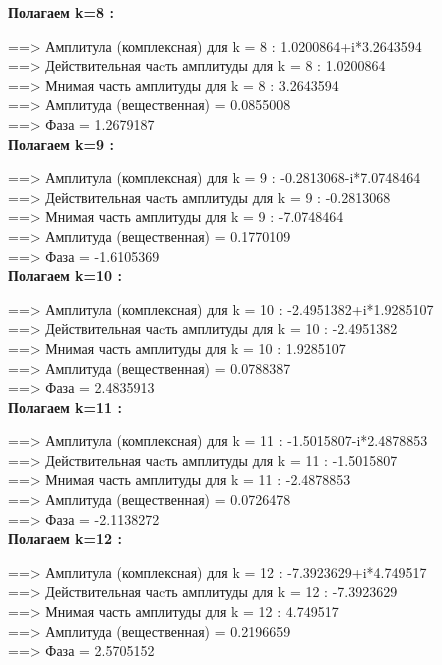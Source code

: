 \documentclass[a4paper,11pt]{article}
\begin{document}
\begin{flushleft}
\textbf{Полагаем k=8 :\\ }

 ==> Амплитула (комплексная) для k = 8 :  1.0200864+i*3.2643594\\ 
 ==> Действительная чаcть амплитуды  для k = 8 : 1.0200864\\ 
 ==> Мнимая часть амплитуды  для k = 8 : 3.2643594\\ 
 ==> Амплитуда (вещественная) = 0.0855008\\ 
 ==> Фаза = 1.2679187\\ 

\textbf{Полагаем k=9 :\\ }

 ==> Амплитула (комплексная) для k = 9 : -0.2813068-i*7.0748464\\ 
 ==> Действительная чаcть амплитуды  для k = 9 : -0.2813068\\ 
 ==> Мнимая часть амплитуды  для k = 9 : -7.0748464\\ 
 ==> Амплитуда (вещественная) = 0.1770109\\ 
 ==> Фаза = -1.6105369\\ 

\textbf{Полагаем k=10 :\\ }

 ==> Амплитула (комплексная) для k = 10 : -2.4951382+i*1.9285107\\ 
 ==> Действительная чаcть амплитуды  для k = 10 : -2.4951382\\ 
 ==> Мнимая часть амплитуды  для k = 10 : 1.9285107\\ 
 ==> Амплитуда (вещественная) = 0.0788387\\ 
 ==> Фаза = 2.4835913\\ 

\textbf{Полагаем k=11 :\\} 

 ==> Амплитула (комплексная) для k = 11 : -1.5015807-i*2.4878853\\ 
 ==> Действительная чаcть амплитуды  для k = 11 : -1.5015807\\ 
 ==> Мнимая часть амплитуды  для k = 11 : -2.4878853\\ 
 ==> Амплитуда (вещественная) = 0.0726478\\ 
 ==> Фаза = -2.1138272\\ 
\textbf{Полагаем k=12 :\\} 

 ==> Амплитула (комплексная) для k = 12 : -7.3923629+i*4.749517\\ 
 ==> Действительная чаcть амплитуды  для k = 12 : -7.3923629\\ 
 ==> Мнимая часть амплитуды  для k = 12 : 4.749517\\ 
 ==> Амплитуда (вещественная) = 0.2196659\\ 
 ==> Фаза = 2.5705152\\ 


\end{flushleft}
\end{document}
